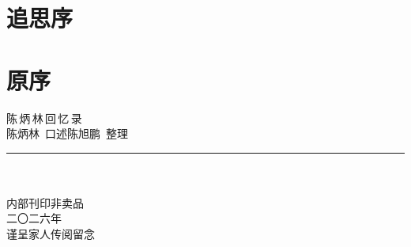 \documentclass[a5paper,11pt,openright,oneside]{ctexbook}
\makeatletter
\newif\ifinappendix
\renewcommand{\thechapter}{\chinese{chapter}}
\renewcommand\appendix{%
  \par
  \setcounter{chapter}{0}%
  \setcounter{section}{0}%
  \gdef\@chapapp{}%
  \gdef\thechapter{附\,\chinese{chapter}}%
  \inappendixtrue
}
\makeatother
\begin{document}
\frontmatter
\pagestyle{fancy}

\chapter*{追思序}



\cleardoublepage

\chapter*{原序}



\cleardoublepage

{\renewcommand{\contentsname}{目\hspace{1em}录}\tableofcontents}
\cleardoublepage

\mainmatter










\appendix






\backmatter
\cleardoublepage
\thispagestyle{empty}
\vspace*{\fill}
\begin{center}
  {\trueka\Large 陈\,炳\,林\,回\,忆\,录}\\[1em]
  {\trueka\small 陈炳林\ 口述\quad 陈旭鹏\ 整理}\\[1.8em]
  {\color{seal}\rule{4em}{0.4pt}}\\[1.6em]
  \redseal\\[2em]
  {\bookserifthin\footnotesize\color{inkgray}
    内部刊印\quad 非卖品\\[4pt]
    二〇二六年\\[2em]
    谨呈家人传阅留念
  }
\end{center}
\vspace*{\fill}
\end{document}
